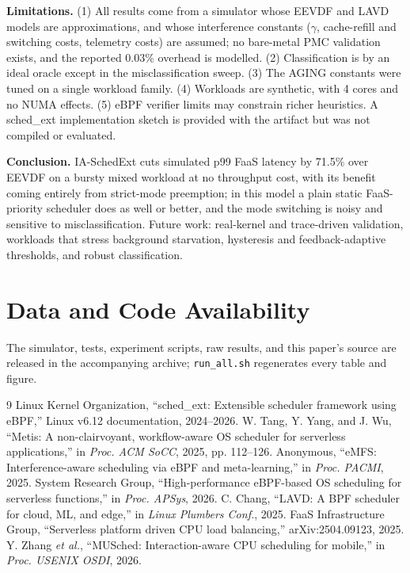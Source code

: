 \documentclass[journal]{IEEEtran}
\begin{document}
\textbf{Limitations.} (1) All results come from a simulator whose EEVDF and LAVD models are approximations, and whose interference constants ($\gamma$, cache-refill and switching costs, telemetry costs) are assumed; no bare-metal PMC validation exists, and the reported 0.03\% overhead is modelled. (2) Classification is by an ideal oracle except in the misclassification sweep. (3) The AGING constants were tuned on a single workload family. (4) Workloads are synthetic, with 4 cores and no NUMA effects. (5) eBPF verifier limits may constrain richer heuristics. A sched\_ext implementation sketch is provided with the artifact but was not compiled or evaluated.

\textbf{Conclusion.} IA-SchedExt cuts simulated p99 FaaS latency by 71.5\% over EEVDF on a bursty mixed workload at no throughput cost, with its benefit coming entirely from strict-mode preemption; in this model a plain static FaaS-priority scheduler does as well or better, and the mode switching is noisy and sensitive to misclassification. Future work: real-kernel and trace-driven validation, workloads that stress background starvation, hysteresis and feedback-adaptive thresholds, and robust classification.

\section*{Data and Code Availability}
The simulator, tests, experiment scripts, raw results, and this paper's source are released in the accompanying archive; \texttt{run\_all.sh} regenerates every table and figure.

\begin{thebibliography}{9}
 Linux Kernel Organization, ``sched\_ext: Extensible scheduler framework using eBPF,'' Linux v6.12 documentation, 2024--2026.
 W. Tang, Y. Yang, and J. Wu, ``Metis: A non-clairvoyant, workflow-aware OS scheduler for serverless applications,'' in \emph{Proc. ACM SoCC}, 2025, pp. 112--126.
 Anonymous, ``eMFS: Interference-aware scheduling via eBPF and meta-learning,'' in \emph{Proc. PACMI}, 2025.
 System Research Group, ``High-performance eBPF-based OS scheduling for serverless functions,'' in \emph{Proc. APSys}, 2026.
 C. Chang, ``LAVD: A BPF scheduler for cloud, ML, and edge,'' in \emph{Linux Plumbers Conf.}, 2025.
 FaaS Infrastructure Group, ``Serverless platform driven CPU load balancing,'' arXiv:2504.09123, 2025.
 Y. Zhang \emph{et al.}, ``MUSched: Interaction-aware CPU scheduling for mobile,'' in \emph{Proc. USENIX OSDI}, 2026.
\end{thebibliography}
\end{document}
